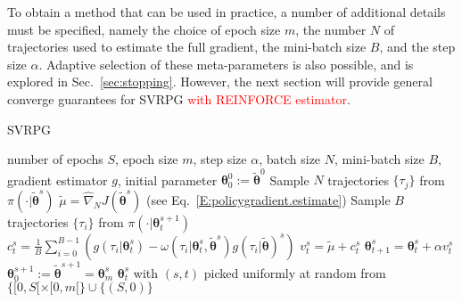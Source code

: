 \documentclass{article}
\theoremstyle{remark}
\theoremstyle{definition}
\newcommand{\vtheta}{\boldsymbol{\theta}}
\newcommand{\Reward}{\mathcal{R}}
\newcommand{\score}[2]{\nabla\log\pi_{#1}(#2)}
\newcommand{\gradApp}[2]{\widehat{\nabla}_{#2}J(#1)}
\newcommand{\wt}[1]{\widetilde{#1}}
\begin{document}
To obtain a method that can be used in practice, a number of additional details must be specified, namely the choice of epoch size $m$, the number $N$ of trajectories used to estimate the full gradient, the mini-batch size $B$, and the step size $\alpha$.
Adaptive selection of these meta-parameters is also possible, and is explored in Sec.~\ref{sec:stopping}.
However, the next section will provide general converge guarantees for SVRPG \textcolor{red}{with REINFORCE estimator}.

\begin{algorithm}[tb]
        \caption{SVRPG}
	\label{alg:svrpg}
	\begin{algorithmic}
         number of epochs $S$, epoch size $m$, step size $\alpha$, batch size $N$, mini-batch size $B$, gradient estimator $g$, initial parameter $\vtheta_{0}^0 := \wt{\vtheta}^0$
        \STATE Sample $N$ trajectories $\{\tau_j\}$ from $\pi(\cdot\vert\tilde{\vtheta}^{s})$
        \STATE $ \wt{\mu} = \gradApp{\wt{\vtheta}^{s}}{N}$ (see Eq.~\ref{E:policygradient.estimate})%
        \STATE Sample $B$ trajectories $\{\tau_i\}$ from $\pi(\cdot\vert\vtheta_t^{s+1})$
        \STATE $c^s_t = \frac{1}{B} \sum\limits_{i=0}^{B-1} \left( g(\tau_i|\vtheta_t^s) - \omega(\tau_i|\vtheta^s_t, \wt{\vtheta}^s) g(\tau_i| \wt{\vtheta})^s\right)$
        \STATE $v^{s}_t = \wt{\mu} + c^s_t$ %
        \STATE $\vtheta_{t+1}^{s} = \vtheta_t^{s} + \alpha v^{s}_t$
		\ENDFOR
        \STATE $\vtheta_0^{s+1} := \tilde{\vtheta}^{s+1} = \vtheta_{m}^s$
		\ENDFOR
         $\vtheta_t^s$ with $(s,t)$ picked uniformly at random from $\{[0,S[\times[0,m[\} \cup \{(S,0)\}$
	\end{algorithmic}
\end{algorithm}
\end{document}
